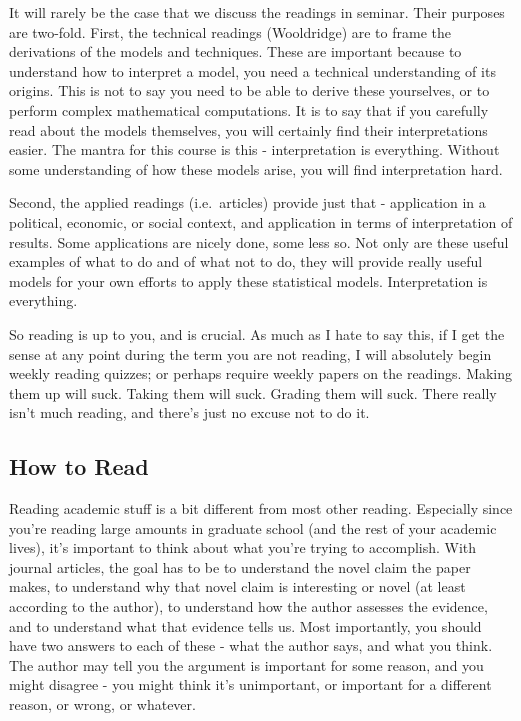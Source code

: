 \documentclass[
  letterpaper,
  DIV=11,
  numbers=noendperiod]{scrartcl}
\begin{document}
It will rarely be the case that we discuss the readings in seminar.
Their purposes are two-fold. First, the technical readings (Wooldridge)
are to frame the derivations of the models and techniques. These are
important because to understand how to interpret a model, you need a
technical understanding of its origins. This is not to say you need to
be able to derive these yourselves, or to perform complex mathematical
computations. It is to say that if you carefully read about the models
themselves, you will certainly find their interpretations easier. The
mantra for this course is this - interpretation is everything. Without
some understanding of how these models arise, you will find
interpretation hard.

Second, the applied readings (i.e.~articles) provide just that -
application in a political, economic, or social context, and application
in terms of interpretation of results. Some applications are nicely
done, some less so. Not only are these useful examples of what to do and
of what not to do, they will provide really useful models for your own
efforts to apply these statistical models. Interpretation is everything.

So reading is up to you, and is crucial. As much as I hate to say this,
if I get the sense at any point during the term you are not reading, I
will absolutely begin weekly reading quizzes; or perhaps require weekly
papers on the readings. Making them up will suck. Taking them will suck.
Grading them will suck. There really isn't much reading, and there's
just no excuse not to do it.

\hypertarget{how-to-read}{%
\subsection{How to Read}\label{how-to-read}}

Reading academic stuff is a bit different from most other reading.
Especially since you're reading large amounts in graduate school (and
the rest of your academic lives), it's important to think about what
you're trying to accomplish. With journal articles, the goal has to be
to understand the novel claim the paper makes, to understand why that
novel claim is interesting or novel (at least according to the author),
to understand how the author assesses the evidence, and to understand
what that evidence tells us. Most importantly, you should have two
answers to each of these - what the author says, and what you think. The
author may tell you the argument is important for some reason, and you
might disagree - you might think it's unimportant, or important for a
different reason, or wrong, or whatever.
\end{document}
